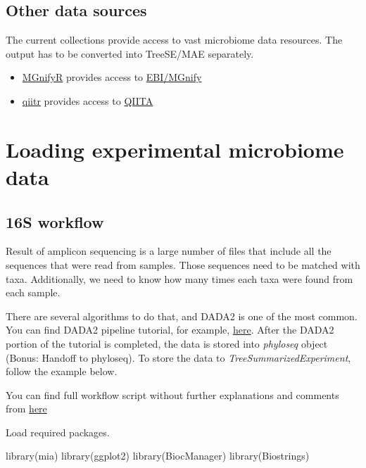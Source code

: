 \documentclass[
]{book}
\newenvironment{Shaded}{\begin{snugshade}}{\end{snugshade}}
\newcommand{\FunctionTok}[1]{\textcolor[rgb]{0.00,0.00,0.00}{#1}}
\newcommand{\NormalTok}[1]{#1}
\providecommand{\tightlist}{%
  \setlength{\itemsep}{0pt}\setlength{\parskip}{0pt}}
\begin{document}
\hypertarget{other-data-sources}{%
\subsection{Other data sources}\label{other-data-sources}}

The current collections provide access to vast microbiome data
resources. The output has to be converted into TreeSE/MAE separately.

\begin{itemize}
\tightlist
\item
  \href{https://github.com/beadyallen/MGnifyR}{MGnifyR} provides access to \href{https://www.ebi.ac.uk/metagenomics/}{EBI/MGnify}
\item
  \href{https://github.com/cran/qiitr}{qiitr} provides access to \href{https://qiita.com/about}{QIITA}
\end{itemize}

\hypertarget{loading-experimental-microbiome-data}{%
\section{Loading experimental microbiome data}\label{loading-experimental-microbiome-data}}

\hypertarget{s-workflow}{%
\subsection{16S workflow}\label{s-workflow}}

Result of amplicon sequencing is a large number of files that include all the sequences
that were read from samples. Those sequences need to be matched with taxa. Additionally,
we need to know how many times each taxa were found from each sample.

There are several algorithms to do that, and DADA2 is one of the most common.
You can find DADA2 pipeline tutorial, for example,
\href{https://benjjneb.github.io/dada2/tutorial.html}{here}.
After the DADA2 portion of the tutorial is completed, the data is stored into \emph{phyloseq} object
(Bonus: Handoff to phyloseq). To store the data to \emph{TreeSummarizedExperiment},
follow the example below.

You can find full workflow script without further explanations and comments from
\href{https://github.com/microbiome/OMA/blob/master/dada2_workflow.Rmd}{here}

Load required packages.

\begin{Shaded}
\begin{Highlighting}[]
\FunctionTok{library}\NormalTok{(mia)}
\FunctionTok{library}\NormalTok{(ggplot2)}
\FunctionTok{library}\NormalTok{(BiocManager)}
\FunctionTok{library}\NormalTok{(Biostrings)}
\end{Highlighting}
\end{Shaded}
\end{document}
